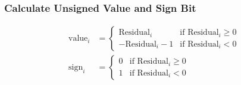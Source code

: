 \subsubsection{Calculate Unsigned Value and Sign Bit}
\begin{align*}
\text{value}_i &=
\begin{cases}
\text{Residual}_i & \text{if } \text{Residual}_i \geq 0 \\
-\text{Residual}_i - 1 & \text{if } \text{Residual}_i < 0
\end{cases} \\
\text{sign}_i &=
\begin{cases}
0 & \text{if } \text{Residual}_i \geq 0 \\
1 & \text{if } \text{Residual}_i < 0
\end{cases}
\end{align*}
